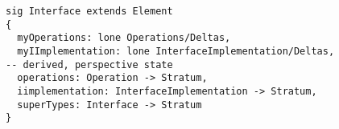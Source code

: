 \lstset{frame=tb, aboveskip=12pt, belowskip=-3pt, breaklines=true, basicstyle=\small\ttfamily, tabsize=2, mathescape=true}
\begin{lstlisting}[caption={bb\_structure.als, lines 79-88}, label=alloy:interface, captionpos=b]
sig Interface extends Element
{
  myOperations: lone Operations/Deltas,
  myIImplementation: lone InterfaceImplementation/Deltas,
-- derived, perspective state
  operations: Operation -> Stratum,  
  iimplementation: InterfaceImplementation -> Stratum,  
  superTypes: Interface -> Stratum
}
\end{lstlisting}
